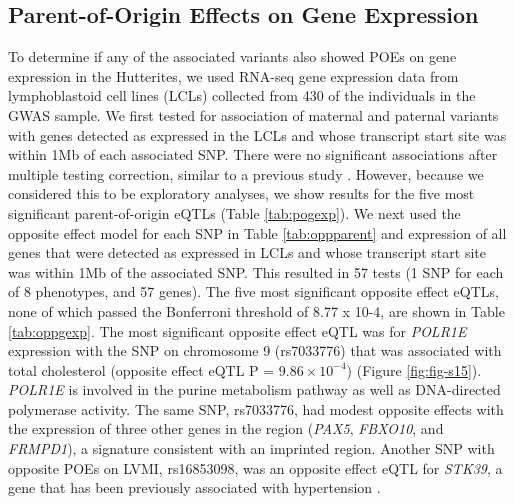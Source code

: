 \subsection{Parent-of-Origin Effects on Gene Expression}\label{Parent-of-Origin Effects on Gene Expression}

To determine if any of the associated variants also showed POEs on gene expression in the Hutterites, we used RNA-seq gene expression data from lymphoblastoid cell lines (LCLs) collected from 430 of the individuals in the GWAS sample. We first tested for association of maternal and paternal variants with genes detected as expressed in the LCLs and whose transcript start site was within 1Mb of each associated SNP. There were no significant associations after multiple testing correction, similar to a previous study \cite{Benonisdottir:2016dz}. However, because we considered this to be exploratory analyses, we show results for the five most significant parent-of-origin eQTLs (Table \ref{tab:pogexp}). We next used the opposite effect model for each SNP in Table \ref{tab:oppparent} and expression of all genes that were detected as expressed in LCLs and whose transcript start site was within 1Mb of the associated SNP. This resulted in 57 tests (1 SNP for each of 8 phenotypes, and 57 genes). The five most significant opposite effect eQTLs, none of which passed the Bonferroni threshold of 8.77 x 10-4, are shown in Table \ref{tab:oppgexp}. The most significant opposite effect eQTL was for \emph{POLR1E} expression with the SNP on chromosome 9 (rs7033776) that was associated with total cholesterol (opposite effect eQTL P = $9.86 \times10^{-4} $) (Figure \ref{fig:fig-s15}). \emph{POLR1E} is involved in the purine metabolism pathway as well as DNA-directed polymerase activity. The same SNP, rs7033776, had modest opposite effects with the expression of three other genes in the region (\emph{PAX5}, \emph{FBXO10}, and \emph{FRMPD1}), a signature consistent with an imprinted region. Another SNP with opposite POEs on LVMI, rs16853098, was an opposite effect eQTL for \emph{STK39}, a gene that has been previously associated with hypertension \cite{Wang:2009bt}.



